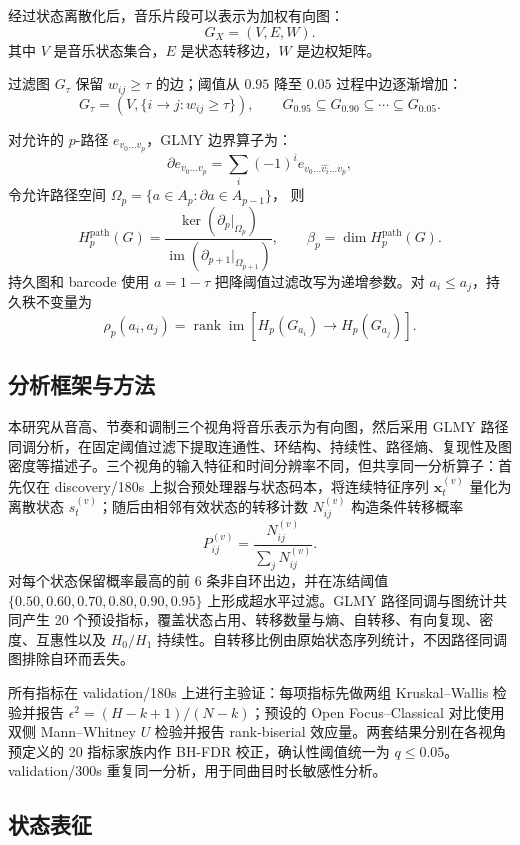 \documentclass{article}
\begin{document}
经过状态离散化后，音乐片段可以表示为加权有向图：
\[G_X=(V,E,W).\]
其中 $V$ 是音乐状态集合，$E$ 是状态转移边，$W$ 是边权矩阵。

过滤图 $G_\tau$ 保留 $w_{ij}\ge\tau$ 的边；阈值从 $0.95$ 降至 $0.05$ 过程中边逐渐增加：
\[G_\tau=
\left(V,\{i\rightarrow j:w_{ij}\ge\tau\}\right), \qquad G_{0.95}\subseteq G_{0.90}\subseteq\cdots\subseteq G_{0.05}.\]

对允许的 $p$-路径 $e_{v_0\ldots v_p}$，GLMY 边界算子为：
\[
\partial e_{v_0\ldots v_p}=\sum_i(-1)^i e_{v_0\ldots\widehat{v_i}\ldots v_p},\]
令允许路径空间 $\Omega_p=\{a\in A_p:\partial a\in A_{p-1}\}$，%
则
\[H_p^{\mathrm{path}}(G)=
\frac{\ker(\partial_p|_{\Omega_p})}{\operatorname{im}(\partial_{p+1}|_{\Omega_{p+1}})},
\qquad \beta_p=\dim H_p^{\mathrm{path}}(G).
\]
持久图和 barcode 使用 $a=1-\tau$ 把降阈值过滤改写为递增参数。对 $a_i\le a_j$，持久秩不变量为
$$
\rho_p(a_i,a_j)=\operatorname{rank}\operatorname{im}
\left[H_p(G_{a_i})\longrightarrow H_p(G_{a_j})\right].
$$

\subsection{分析框架与方法}

本研究从音高、节奏和调制三个视角将音乐表示为有向图，然后采用 GLMY 路径同调分析，在固定阈值过滤下提取连通性、环结构、持续性、路径熵、复现性及图密度等描述子。三个视角的输入特征和时间分辨率不同，但共享同一分析算子：首先仅在 discovery/180s 上拟合预处理器与状态码本，将连续特征序列 $\mathbf{x}^{(v)}_t$ 量化为离散状态 $s^{(v)}_t$；随后由相邻有效状态的转移计数 $N^{(v)}_{ij}$ 构造条件转移概率
\[
P^{(v)}_{ij}=\frac{N^{(v)}_{ij}}{\sum_jN^{(v)}_{ij}}.
\]
对每个状态保留概率最高的前 $6$ 条非自环出边，并在冻结阈值 $\{0.50,0.60,0.70,0.80,0.90,0.95\}$ 上形成超水平过滤。GLMY 路径同调与图统计共同产生 20 个预设指标，覆盖状态占用、转移数量与熵、自转移、有向复现、密度、互惠性以及 $H_0/H_1$ 持续性。自转移比例由原始状态序列统计，不因路径同调图排除自环而丢失。

所有指标在 validation/180s 上进行主验证：每项指标先做两组 Kruskal--Wallis 检验并报告 $\epsilon^2=(H-k+1)/(N-k)$；预设的 Open Focus--Classical 对比使用双侧 Mann--Whitney $U$ 检验并报告 rank-biserial 效应量。两套结果分别在各视角预定义的 20 指标家族内作 BH-FDR 校正，确认性阈值统一为 $q\le0.05$。validation/300s 重复同一分析，用于同曲目时长敏感性分析。

\subsection{状态表征}
\end{document}

